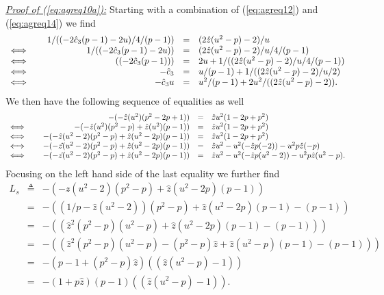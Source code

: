 \documentclass[10pt]{article}
\begin{document}
\noindent\underline{\emph{Proof of (\ref{eq:agreq10a}):}} Starting with a combination of (\ref{eq:agreq12}) and (\ref{eq:agreq14})
 we find
 \begin{eqnarray}
\begin{array}{lrclcl}
  &  1/((-2 \hat{c}_3 (p-1)-2u)/4/(p-1))    & = &      (2\hat{z}(u^2-p)-2)/u  \\
\Longleftrightarrow \quad $ $ &  1/((-2\hat{c}_3 (p-1)-2u))   & = &   (2\hat{z}(u^2-p)-2)/u/4/(p-1) \\
\Longleftrightarrow \quad $ $ & ((-2 \hat{c}_3 (p-1)))     & = &   2u+1/((2\hat{z}(u^2-p)-2)/u/4/(p-1))  \\
\Longleftrightarrow \quad $ $ & -\hat{c}_3   & = &     u/(p-1)+1/((2\hat{z}(u^2-p)-2)/u/2)   \\
\Longleftrightarrow \quad $ $ &   -\hat{c}_3 u    & = &   u^2/(p-1)+2u^2/((2\hat{z}(u^2-p)-2)) .
\end{array}\label{eq:agreq17}
  \end{eqnarray}
We then have the following sequence of equalities as well
 \begin{eqnarray}
\begin{array}{lrclcl}
  &   -(-\hat{z}(u^2)(p^2-2p+1 )  )      & = &    \hat{z}u^2 (1-2p+p^2)  \\
\Longleftrightarrow \quad $ $ &  -(-\hat{z}(u^2)(p^2-p) + \hat{z}(u^2)(p-1) )   & = &  \hat{z} u^2 (1-2p+p^2) \\
\Longleftrightarrow \quad $ $ &  -(-\hat{z}(u^2-2)(p^2-p) + \hat{z}(u^2-2p)(p-1) )      & = &  \hat{z}u^2 (1- 2p +p^2)  \\
\Longleftrightarrow \quad $ $ &   -(-z\hat{}(u^2-2)(p^2-p) + \hat{z}(u^2-2p)(p-1) )    & = &  \hat{z} u^2- u^2(-\hat{z}p(-2))-u^2 p \hat{z}(-p)  \\
\Longleftrightarrow \quad $ $ &   -(-z\hat{}(u^2-2)(p^2-p) + \hat{z}(u^2-2p)(p-1) )    & = &  \hat{z}u^2- u^2(-\hat{z}p(u^2-2))-u^2p\hat{z}(u^2-p) .
 \end{array}\nonumber \\ \label{eq:agreq18}
  \end{eqnarray}
Focusing on the left hand side of the last equality  we further find
 \begin{eqnarray}
 L_s & \triangleq &
  -(-z\hat{}(u^2-2)(p^2-p) + \hat{z}(u^2-2p)(p-1) )   \nonumber \\
  & = &    -((1/p-\hat{z}(u^2-2))(p^2-p) + \hat{z}(u^2-2p)(p-1) -(p-1))
  \nonumber \\
  & = &   -((\hat{z}^2(p^2-p)(u^2-p) + \hat{z}(u^2-2p)(p-1) -(p-1)))
  \nonumber \\
  & = &    -((\hat{z}^2(p^2-p)(u^2-p)-(p^2-p)\hat{z} + \hat{z}(u^2-p)(p-1) -(p-1)))
  \nonumber \\
  & = &   -(p-1+(p^2-p)\hat{z})((\hat{z}(u^2-p)-1))
  \nonumber \\
  & = &   -(1+p\hat{z})(p-1)((\hat{z}(u^2-p)-1)) .
 \label{eq:agreq19}
  \end{eqnarray}
\end{document}
